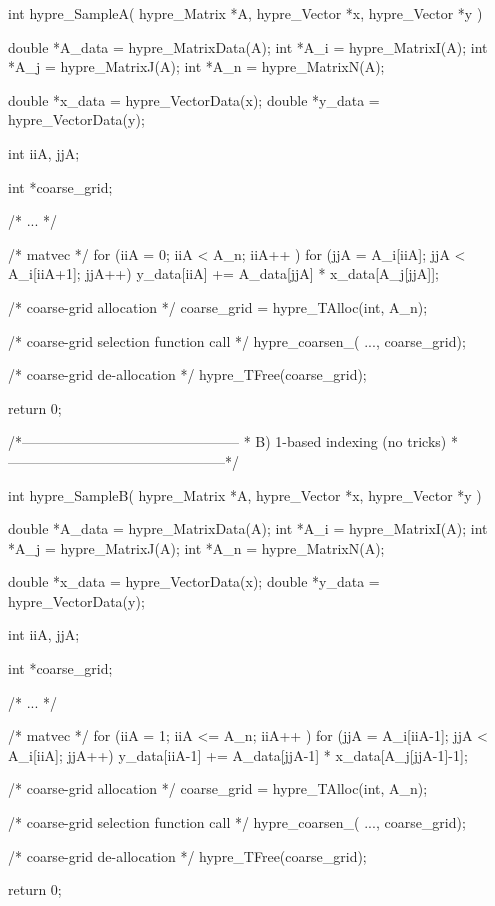 int
hypre_SampleA( hypre_Matrix *A,
               hypre_Vector *x,
               hypre_Vector *y )
{
   double  *A_data = hypre_MatrixData(A);
   int     *A_i    = hypre_MatrixI(A);
   int     *A_j    = hypre_MatrixJ(A);
   int     *A_n    = hypre_MatrixN(A);

   double  *x_data = hypre_VectorData(x);
   double  *y_data = hypre_VectorData(y);

   int      iiA, jjA;

   int     *coarse_grid;

   /* ... */

   /* matvec */
   for (iiA = 0; iiA < A_n; iiA++ )
   {
      for (jjA = A_i[iiA]; jjA < A_i[iiA+1]; jjA++)
      {
         y_data[iiA] += A_data[jjA] * x_data[A_j[jjA]];
      }
   }

   /* coarse-grid allocation */
   coarse_grid = hypre_TAlloc(int, A_n);

   /* coarse-grid selection function call */
   hypre_coarsen_( ..., coarse_grid);

   /* coarse-grid de-allocation */
   hypre_TFree(coarse_grid);

   return 0;
}

/*-----------------------------------------------
 * B) 1-based indexing (no tricks)
 *-----------------------------------------------*/

int
hypre_SampleB( hypre_Matrix *A,
               hypre_Vector *x,
               hypre_Vector *y )
{
   double  *A_data = hypre_MatrixData(A);
   int     *A_i    = hypre_MatrixI(A);
   int     *A_j    = hypre_MatrixJ(A);
   int     *A_n    = hypre_MatrixN(A);

   double  *x_data = hypre_VectorData(x);
   double  *y_data = hypre_VectorData(y);

   int      iiA, jjA;

   int     *coarse_grid;

   /* ... */

   /* matvec */
   for (iiA = 1; iiA <= A_n; iiA++ )
   {
      for (jjA = A_i[iiA-1]; jjA < A_i[iiA]; jjA++)
      {
         y_data[iiA-1] += A_data[jjA-1] * x_data[A_j[jjA-1]-1];
      }
   }

   /* coarse-grid allocation */
   coarse_grid = hypre_TAlloc(int, A_n);

   /* coarse-grid selection function call */
   hypre_coarsen_( ..., coarse_grid);

   /* coarse-grid de-allocation */
   hypre_TFree(coarse_grid);

   return 0;
}

